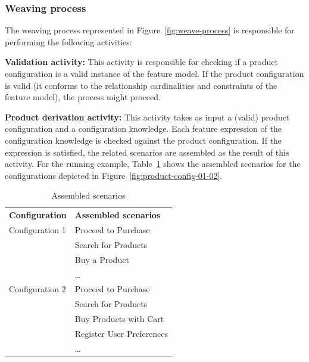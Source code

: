 \documentclass{acm_proc_article-sp}
\begin{document}
\subsubsection{Weaving process}

The weaving process represented in Figure~\ref{fig:weave-process} is responsible for performing the following activities: 

{\bf Validation activity:} This activity is responsible for checking if a product configuration is a valid instance of the feature model. If the product configuration is 
valid (it conforms to the relationship cardinalities and constraints of the feature model), the process might proceed. 

{\bf Product derivation activity:} This activity takes as input a (valid) product configuration and a configuration knowledge. 
Each feature expression of the configuration knowledge is checked against the product configuration. If the expression 
is satisfied, the related scenarios are assembled as the result of this activity. For the running example, 
Table~\ref{tab:assembled-scenarios} shows the assembled scenarios for the configurations depicted in Figure~\ref{fig:product-config-01-02}.

\begin{table}[h]
\begin{center}
\caption{Assembled scenarios} \label{tab:assembled-scenarios}
\begin{tabular}{ll}
   \hline\noalign{\smallskip}
  {\bf Configuration} & {\bf Assembled scenarios} \\
   \noalign{\smallskip}
   \hline
   \noalign{\smallskip}
    Configuration 1\hspace{15pt} & Proceed to Purchase \\
                                                   & Search for Products \\
                                                   & Buy a Product \\
                             			  & \ldots \\
   Configuration 2                        & Proceed to Purchase \\
                             			  & Search for Products	 \\
			                           & Buy Products with Cart \\
                                                   & Register User Preferences \\
                             & \ldots       \\
  \hline
\end{tabular}
\end{center}
\end{table}
 
\end{document}
